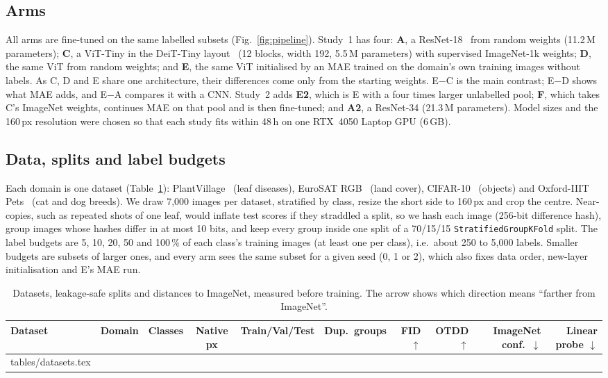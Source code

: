 \documentclass[conference]{IEEEtran}
\makeatletter
\newcommand{\tabinput}[1]{\@@input #1 }
\makeatother
\begin{document}
\subsection{Arms}
All arms are fine-tuned on the same labelled subsets (Fig.~\ref{fig:pipeline}). Study~1 has four: \textbf{A}, a
ResNet-18~\cite{he2016resnet} from random weights (11.2\,M parameters); \textbf{C}, a ViT-Tiny in the DeiT-Tiny
layout~\cite{touvron2021deit} (12 blocks, width 192, 5.5\,M parameters) with supervised ImageNet-1k weights;
\textbf{D}, the same ViT from random weights; and \textbf{E}, the same ViT initialised by an MAE trained on the
domain's own training images without labels. As C, D and E share one architecture, their differences come only from
the starting weights. E$-$C is the main contrast; E$-$D shows what MAE adds, and E$-$A compares it with a CNN.
Study~2 adds \textbf{E2}, which is E with a four times larger unlabelled pool; \textbf{F}, which takes C's
ImageNet weights, continues MAE on that pool and is then fine-tuned; and \textbf{A2}, a ResNet-34 (21.3\,M
parameters). Model sizes and the 160\,px resolution were chosen so that each study fits within 48\,h on one
RTX~4050 Laptop GPU (6\,GB).

\subsection{Data, splits and label budgets}
Each domain is one dataset (Table~\ref{tab:data}): PlantVillage~\cite{hughes2015plantvillage} (leaf diseases),
EuroSAT RGB~\cite{helber2019eurosat} (land cover), CIFAR-10~\cite{krizhevsky2009cifar} (objects) and Oxford-IIIT
Pets~\cite{parkhi2012pets} (cat and dog breeds). We draw 7,000 images per dataset, stratified by class, resize the
short side to 160\,px and crop the centre. Near-copies, such as repeated shots of one leaf, would inflate test
scores if they straddled a split, so we hash each image (256-bit difference hash), group images whose hashes differ
in at most 10 bits, and keep every group inside one split of a 70/15/15 \texttt{StratifiedGroupKFold} split. The
label budgets are 5, 10, 20, 50 and 100\,\% of each class's training images (at least one per class), i.e.\ about
250 to 5,000 labels. Smaller budgets are subsets of larger ones, and every arm sees the same subset for a given
seed (0, 1 or 2), which also fixes data order, new-layer initialisation and E's MAE run.

\begin{table}[t]
\centering
\caption{Datasets, leakage-safe splits and distances to ImageNet, measured before training. The arrow shows which
direction means ``farther from ImageNet''.}
\label{tab:data}
\footnotesize
\begin{tabular}{llccccrrrr}
\toprule
Dataset & Domain & Classes & Native px & Train/Val/Test & Dup.\ groups & FID $\uparrow$ & OTDD $\uparrow$ &
ImageNet conf.\ $\downarrow$ & Linear probe $\downarrow$ \\
\midrule
\tabinput{tables/datasets.tex}
\bottomrule
\end{tabular}
\end{table}
\end{document}
